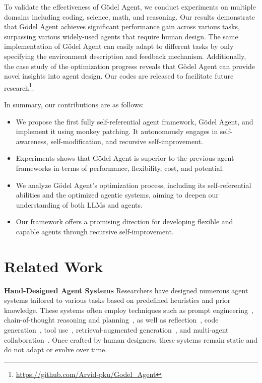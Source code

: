 \documentclass[11pt]{article}
\newcommand{\framework}{Gödel Agent\xspace}
\begin{document}
To validate the effectiveness of \framework, we conduct experiments on multiple domains including coding, science, math, and reasoning. Our results demonstrate that \framework achieves significant performance gain across various tasks, surpassing various widely-used agents that require human design. The same implementation of \framework can easily adapt to different tasks by only specifying the environment description and feedback mechanism. Additionally, the case study of the optimization progress reveals that \framework can provide novel insights into agent design. Our codes are released to facilitate future research\footnote{\href{https://github.com/Arvid-pku/Godel\_Agent}{https://github.com/Arvid-pku/Godel\_Agent}}. 






In summary, our contributions are as follows:
\vspace{-7pt}
\begin{itemize}[leftmargin=*,itemsep=1pt]
    \item We propose the first fully self-referential agent framework, \framework, and implement it using monkey patching. It autonomously engages in self-awareness, self-modification, and recursive self-improvement.
    
    \item Experiments shows that \framework{} is superior to the previous agent frameworks in terms of performance, flexibility, cost, and potential.
    
    \item We analyze \framework’s optimization process, including its self-referential abilities and the optimized agentic systems, aiming to deepen our understanding of both LLMs and agents.
    \item Our framework offers a promising direction for developing flexible and capable agents through recursive self-improvement.
\end{itemize}


\section{Related Work}

\textbf{Hand-Designed Agent Systems} \quad
Researchers have designed numerous agent systems tailored to various tasks based on predefined heuristics and prior knowledge. These systems often employ techniques such as prompt engineering~\citep{chen2023unleashing,schulhoff2024prompt}, chain-of-thought reasoning and planning~\citep{wei2022chain,yao2022react}, as well as reflection~\citep{shinn2024reflexion,madaan2024self}, code generation~\citep{wang2023voyager,vemprala2024chatgpt}, tool use~\citep{nakano2021webgpt,qu2024tool}, retrieval-augmented generation~\citep{lewis2020retrieval,zhang2024survey}, and multi-agent collaboration~\citep{xu2023expertpromptinginstructinglargelanguage,wu2023autogen,qian2023communicative,hong2023metagpt}. Once crafted by human designers, these systems remain static and do not adapt or evolve over time.
\end{document}
